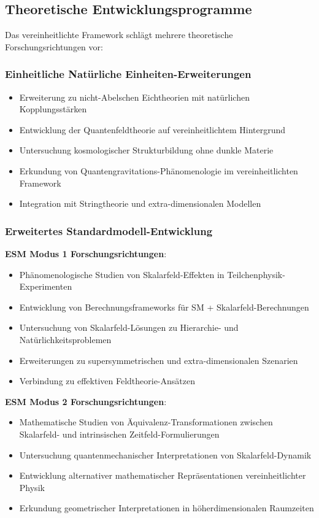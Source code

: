 \documentclass[12pt,a4paper]{article}
\begin{document}
	\subsection{Theoretische Entwicklungsprogramme}
	\label{subsec:theoretical_development}
	
	Das vereinheitlichte Framework schlägt mehrere theoretische Forschungsrichtungen vor:
	
	\subsubsection{Einheitliche Natürliche Einheiten-Erweiterungen}
	\label{subsubsec:unified_extensions}
	
	\begin{itemize}
		\item Erweiterung zu nicht-Abelschen Eichtheorien mit natürlichen Kopplungsstärken
		\item Entwicklung der Quantenfeldtheorie auf vereinheitlichtem Hintergrund
		\item Untersuchung kosmologischer Strukturbildung ohne dunkle Materie
		\item Erkundung von Quantengravitations-Phänomenologie im vereinheitlichten Framework
		\item Integration mit Stringtheorie und extra-dimensionalen Modellen
	\end{itemize}
	
	\subsubsection{Erweitertes Standardmodell-Entwicklung}
	\label{subsubsec:esm_development}
	
	\textbf{ESM Modus 1 Forschungsrichtungen}:
	\begin{itemize}
		\item Phänomenologische Studien von Skalarfeld-Effekten in Teilchenphysik-Experimenten
		\item Entwicklung von Berechnungsframeworks für SM + Skalarfeld-Berechnungen
		\item Untersuchung von Skalarfeld-Lösungen zu Hierarchie- und Natürlichkeitsproblemen
		\item Erweiterungen zu supersymmetrischen und extra-dimensionalen Szenarien
		\item Verbindung zu effektiven Feldtheorie-Ansätzen
	\end{itemize}
	
	\textbf{ESM Modus 2 Forschungsrichtungen}:
	\begin{itemize}
		\item Mathematische Studien von Äquivalenz-Transformationen zwischen Skalarfeld- und intrinsischen Zeitfeld-Formulierungen
		\item Untersuchung quantenmechanischer Interpretationen von Skalarfeld-Dynamik
		\item Entwicklung alternativer mathematischer Repräsentationen vereinheitlichter Physik
		\item Erkundung geometrischer Interpretationen in höherdimensionalen Raumzeiten
	\end{itemize}
	
\end{document}
